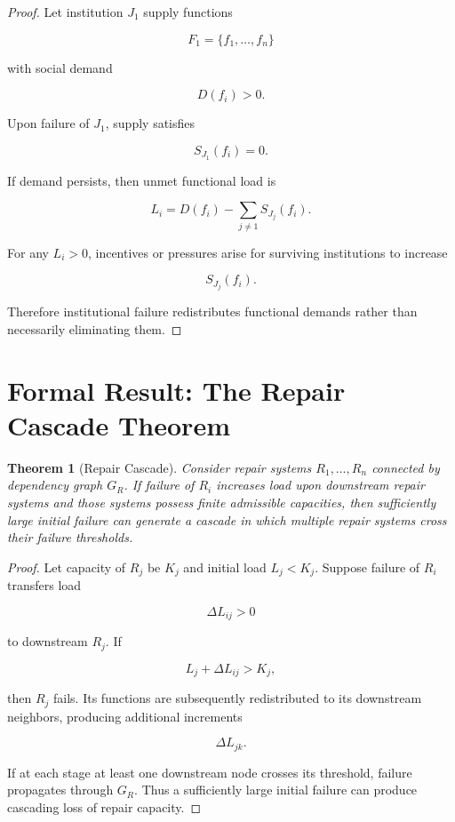 \documentclass[11pt,oneside]{book}
\newtheorem{theorem}{Theorem}[chapter]
\theoremstyle{definition}
\theoremstyle{remark}
\begin{document}
\begin{proof}
Let institution \(J_1\) supply functions

\[
F_1=\{f_1,\ldots,f_n\}
\]

with social demand

\[
D(f_i)>0.
\]

Upon failure of \(J_1\), supply satisfies

\[
S_{J_1}(f_i)=0.
\]

If demand persists, then unmet functional load is

\[
L_i
=
D(f_i)-\sum_{j\neq1}S_{J_j}(f_i).
\]

For any \(L_i>0\), incentives or pressures arise for surviving institutions to increase

\[
S_{J_j}(f_i).
\]

Therefore institutional failure redistributes functional demands rather than necessarily eliminating them.
\end{proof}

\section{Formal Result: The Repair Cascade Theorem}

\begin{theorem}[Repair Cascade]
Consider repair systems \(R_1,\ldots,R_n\) connected by dependency graph \(G_R\). If failure of \(R_i\) increases load upon downstream repair systems and those systems possess finite admissible capacities, then sufficiently large initial failure can generate a cascade in which multiple repair systems cross their failure thresholds.
\end{theorem}

\begin{proof}
Let capacity of \(R_j\) be \(K_j\) and initial load \(L_j<K_j\). Suppose failure of \(R_i\) transfers load

\[
\Delta L_{ij}>0
\]

to downstream \(R_j\). If

\[
L_j+\Delta L_{ij}>K_j,
\]

then \(R_j\) fails. Its functions are subsequently redistributed to its downstream neighbors, producing additional increments

\[
\Delta L_{jk}.
\]

If at each stage at least one downstream node crosses its threshold, failure propagates through \(G_R\). Thus a sufficiently large initial failure can produce cascading loss of repair capacity.
\end{proof}
\end{document}
